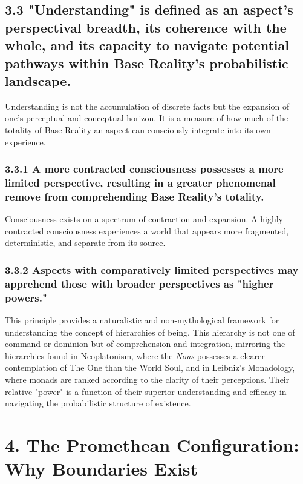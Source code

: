 \subsection*{3.3 "Understanding" is defined as an aspect's perspectival breadth, its coherence with the whole, and its capacity to navigate potential pathways within Base Reality's probabilistic landscape.}


Understanding is not the accumulation of discrete facts but the expansion of one's perceptual and conceptual horizon. It is a measure of how much of the totality of Base Reality an aspect can consciously integrate into its own experience.


\subsubsection*{3.3.1 A more contracted consciousness possesses a more limited perspective, resulting in a greater phenomenal remove from comprehending Base Reality's totality.}


Consciousness exists on a spectrum of contraction and expansion. A highly contracted consciousness experiences a world that appears more fragmented, deterministic, and separate from its source.


\subsubsection*{3.3.2 Aspects with comparatively limited perspectives may apprehend those with broader perspectives as "higher powers."}


This principle provides a naturalistic and non-mythological framework for understanding the concept of hierarchies of being. This hierarchy is not one of command or dominion but of comprehension and integration, mirroring the hierarchies found in Neoplatonism, where the \textit{Nous} possesses a clearer contemplation of The One than the World Soul, and in Leibniz's Monadology, where monads are ranked according to the clarity of their perceptions. Their relative "power" is a function of their superior understanding and efficacy in navigating the probabilistic structure of existence.


\bigskip\noindent\makebox[\textwidth]{\color{rulegray}\rule{5cm}{0.3pt}}\bigskip


\section*{4. The Promethean Configuration: Why Boundaries Exist}


